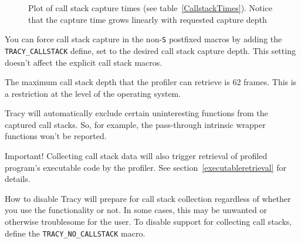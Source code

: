 \documentclass[hidelinks,titlepage,a4paper,twoside]{article}
\begin{document}
\begin{figure}[h]
\centering{}
\caption{Plot of call stack capture times (see table~\ref{CallstackTimes}). Notice that the capture time grows linearly with requested capture depth}
\label{CallstackPlot}
\end{figure}

You can force call stack capture in the non-\texttt{S} postfixed macros by adding the \texttt{TRACY\_CALLSTACK} define, set to the desired call stack capture depth. This setting doesn't affect the explicit call stack macros.

The maximum call stack depth that the profiler can retrieve is 62 frames. This is a restriction at the level of the operating system.

Tracy will automatically exclude certain uninteresting functions from the captured call stacks. So, for example, the pass-through intrinsic wrapper functions won't be reported.

\begin{bclogo}[
noborder=true,
couleur=black!5,
logo=\bcbombe
]{Important!}
Collecting call stack data will also trigger retrieval of profiled program's executable code by the profiler. See section~\ref{executableretrieval} for details.
\end{bclogo}

\begin{bclogo}[
noborder=true,
couleur=black!5,
logo=\bclampe
]{How to disable}
Tracy will prepare for call stack collection regardless of whether you use the functionality or not. In some cases, this may be unwanted or otherwise troublesome for the user. To disable support for collecting call stacks, define the \texttt{TRACY\_NO\_CALLSTACK} macro.
\end{bclogo}
\end{document}
